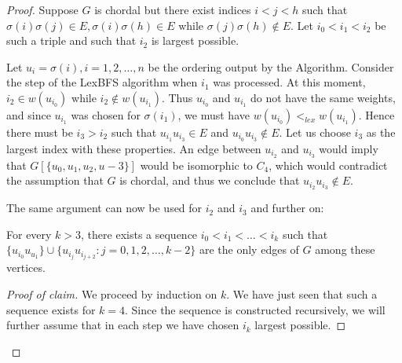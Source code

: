 \begin{proof}
	Suppose $G$ is chordal but there exist indices $i < j < h$ such that $\sigma(i)\sigma(j) \in E, \sigma(i)\sigma(h) \in E$ while $\sigma(j)\sigma(h) \notin E$. Let $i_0 < i_1 < i_2$ be such a triple and such that $i_2$ is largest possible.
	
	Let $u_i = \sigma(i), i = 1, 2, \dots , n$ be the ordering output by the Algorithm. Consider the step of the LexBFS algorithm when $i_1$ was processed. At this moment, $i_2 \in w(u_{i_0})$ while $i_2 \notin w(u_{i_1})$. Thus $u_{i_0}$ and $u_{i_1}$ do not have the same weights, and since $u_{i_1}$ was chosen for $\sigma(i_1)$, we must have $w(u_{i_0}) <_{lex} w(u_{i_1})$. Hence there must be $i_3 > i_2$ such that $u_{i_1} u_{i_3} \in E$ and $u_{i_0} u_{i_3} \notin E$. Let us choose $i_3$ as the largest index with these properties. An edge between $u_{i_2}$ and $u_{i_3}$ would imply that $G[\{u_0 , u_1 , u_2 ,u-3 \}]$ would be isomorphic to $C_4$, which would contradict the assumption that $G$ is chordal, and thus we conclude that $u_{i_2} u_{i_3} \notin E$.
	
	The same argument can now be used for $i_2$ and $i_3$ and further on:
	
	\begin{claim}
		For every $k > 3$, there exists a sequence $i_0 < i_1 < \dots < i_k$ such that $\{u_{i_0} u_{u_1}\} \cup \{u_{i_j} u_{i_{j+2}} : j = 0, 1, 2, \dots, k - 2\}$ are the only edges of $G$ among these vertices.
	\end{claim}
	
	\begin{proof}[Proof of claim]
		We proceed by induction on $k$. We have just seen that such a sequence exists for $k = 4$. Since the sequence is constructed recursively, we will further assume that in each step we have chosen $i_k$ largest possible.
		

\end{proof}
\end{proof}
